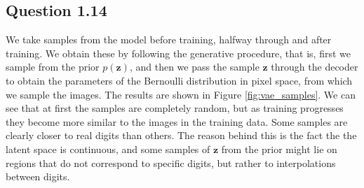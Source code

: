 \documentclass{article}
\begin{document}
\subsection*{Question 1.14}

We take samples from the model before training, halfway through and after training. We obtain these by following the generative procedure, that is, first we sample from the prior $p(\mathbf{z})$, and then we pass the sample $\mathbf{z}$ through the decoder to obtain the parameters of the Bernoulli distribution in pixel space, from which we sample the images. The results are shown in Figure \ref{fig:vae_samples}. We can see that at first the samples are completely random, but as training progresses they become more similar to the images in the training data. Some samples are clearly closer to real digits than others. The reason behind this is the fact the the latent space is continuous, and some samples of $\mathbf{z}$ from the prior might lie on regions that do not correspond to specific digits, but rather to interpolations between digits.
\end{document}
